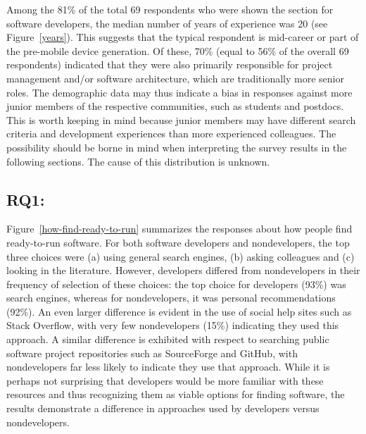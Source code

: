 \documentclass[review]{elsarticle}
\newcommand{\totalRespondents}{69\xspace}
\begin{document}
Among the 81\% of the total \totalRespondents respondents who were shown the section for software developers, the median number of years of experience was 20 (see Figure~\ref{years}). This suggests that the typical respondent is mid-career or part of the pre-mobile device generation.  Of these, 70\% (equal to 56\% of the overall \totalRespondents respondents) indicated that they were also primarily responsible for project management and/or software architecture, which are traditionally more senior roles.  The demographic data may thus indicate a bias in responses against more junior members of the respective communities, such as students and postdocs.  This is worth keeping in mind because junior members may have different search criteria and development experiences than more experienced colleagues. The possibility should be borne in mind when interpreting the survey results in the following sections. The cause of this distribution is unknown.


\subsection{RQ1: \rqonetext}
\label{discussion-rqone}

Figure~\ref{how-find-ready-to-run} summarizes the responses about how people find ready-to-run software.  For both software developers and nondevelopers, the top three choices were (a) using general search engines, (b) asking colleagues and (c) looking in the literature.  However, developers differed from nondevelopers in their frequency of selection of these choices: the top choice for developers (93\%) was search engines, whereas for nondevelopers, it was personal recommendations (92\%).  An even larger difference is evident in the use of social help sites such as Stack Overflow, with very few nondevelopers (15\%) indicating they used this approach.  A similar difference is exhibited with respect to searching public software project repositories such as SourceForge and GitHub, with nondevelopers far less likely to indicate they use that approach.  While it is perhaps not surprising that developers would be more familiar with these resources and thus recognizing them as viable options for finding software, the results demonstrate a difference in approaches used by developers versus nondevelopers.
\end{document}
